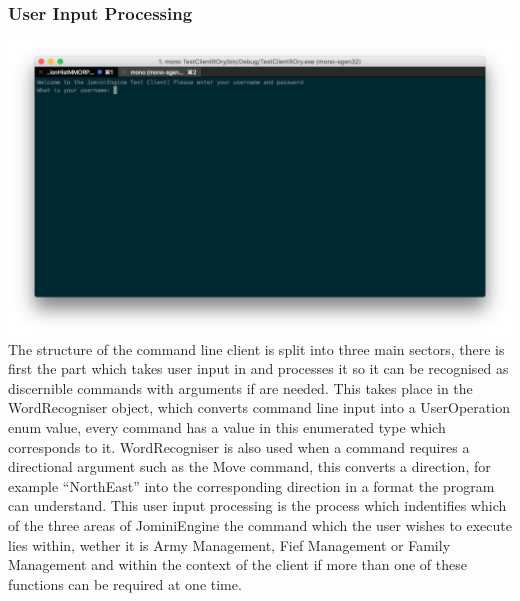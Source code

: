 \documentclass{article}
\begin{document}
\subsubsection{User Input Processing}
\includegraphics[width=\textwidth]{text1.png}
The structure of the command line client is split into three main sectors, there is first the part which takes user input in and processes it so it can be recognised as discernible commands with arguments if are needed. This takes place in the WordRecogniser object, which converts command line input into a UserOperation enum value, every command has a value in this enumerated type which corresponds to it. WordRecogniser is also used when a command requires a directional argument such as the Move command, this converts a direction, for example “NorthEast” into the corresponding direction in a format the program can understand. This user input processing is the process which indentifies which of the three areas of JominiEngine the command which the user wishes to execute lies within, wether it is Army Management, Fief Management or Family Management and within the context of the client if more than one of these functions can be required at one time.
\end{document}
